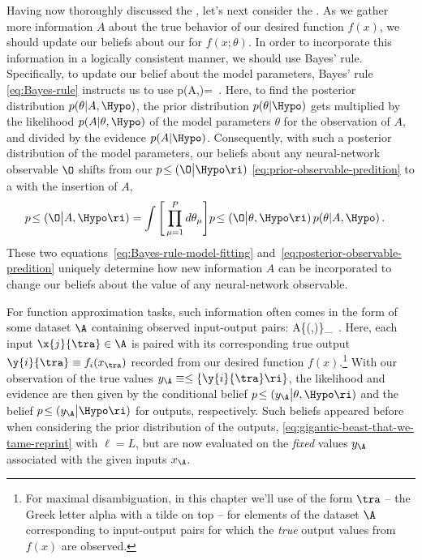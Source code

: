 







Having now thoroughly discussed the , let's next consider the . As we gather more information $A$ about the true behavior of our desired function $f(x)$, we should update our beliefs about our  for $f(x;\theta)$.
In order to incorporate this information in a logically consistent manner, we should use  Bayes' rule.
Specifically, to update our belief about the model parameters, Bayes' rule \eqref{eq:Bayes-rule} instructs us to use
\be\label{eq:Bayes-rule-model-fitting}
p(\theta \vert A,\Hypo)=\, .%
\ee
Here, to find the posterior distribution $p(\theta \vert A,\Hypo)$,  the  prior distribution $p(\theta\vert\Hypo)$ gets multiplied by the likelihood $p(A \vert \theta,\Hypo)$ of the model parameters $\theta$ for the observation of $A$,
and divided by
the evidence $p(A\vert\Hypo)$.
Consequently, with such a posterior distribution of the model parameters, our beliefs about any neural-network observable $\O$ shifts from our  $p\!\le(\O \big|\Hypo \ri)$ \eqref{eq:prior-observable-predition} to a  with the insertion of $A$,
\begin{align}\label{eq:posterior-observable-predition}
p\!\le(\O \big|A, \Hypo \ri) &=\int \Bigg[\prod_{\mu=1}^{P} d \theta_{\mu}\Bigg] p\!\le(\O \big|\theta, \Hypo \ri)\, p(\theta|A, \Hypo)\, .
\end{align}
These two equations~\eqref{eq:Bayes-rule-model-fitting} and~\eqref{eq:posterior-observable-predition} uniquely determine how new information $A$ can be incorporated to change our beliefs about the value of any neural-network observable.


For function approximation tasks, such information often
comes in the form of some dataset $\A$ containing observed input-output pairs:
\be\label{eq:input-output-information}
A\equiv \le\{(,)\ri\}\vert_{\tra\in\A} \,.
\ee 
Here, each input $\x{j}{\tra}\in{\A}$ is paired with its corresponding true output $\y{i}{\tra}\equiv f_i(x_{\tra})$ recorded from our desired function $f(x)$.\footnote{For maximal disambiguation, in this chapter we'll use  of the form $\tra$ -- the Greek letter alpha with a tilde on top --  for elements of the dataset $\A$ corresponding to input-output pairs for which the \emph{true} output values from $f(x)$ are observed.} 
With our observation of the true values $y_{\A}\equiv\le\{\y{i}{\tra}\ri\}$, the likelihood and evidence are then given by the conditional belief $p\!\le(y_{\A} \big|\theta, \Hypo \ri)$ and the belief $p\!\le(y_{\A} \big| \Hypo \ri)$ for outputs, respectively. Such beliefs appeared before when considering the prior distribution of the outputs, \eqref{eq:gigantic-beast-that-we-tame-reprint} with $\ell= L$, but are now evaluated on the \emph{fixed} values $y_{\A}$ associated with the given inputs $x_{\A}$. 

